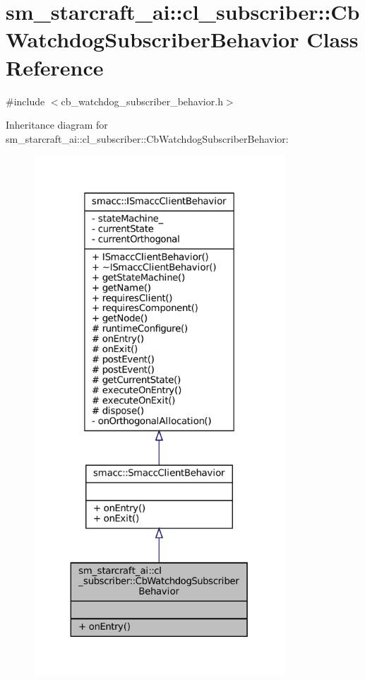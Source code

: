 \hypertarget{classsm__starcraft__ai_1_1cl__subscriber_1_1CbWatchdogSubscriberBehavior}{}\section{sm\+\_\+starcraft\+\_\+ai\+:\+:cl\+\_\+subscriber\+:\+:Cb\+Watchdog\+Subscriber\+Behavior Class Reference}
\label{classsm__starcraft__ai_1_1cl__subscriber_1_1CbWatchdogSubscriberBehavior}


{\ttfamily \#include $<$cb\+\_\+watchdog\+\_\+subscriber\+\_\+behavior.\+h$>$}



Inheritance diagram for sm\+\_\+starcraft\+\_\+ai\+:\+:cl\+\_\+subscriber\+:\+:Cb\+Watchdog\+Subscriber\+Behavior\+:
\nopagebreak
\begin{figure}[H]
\begin{center}
\leavevmode
\includegraphics[height=550pt]{classsm__starcraft__ai_1_1cl__subscriber_1_1CbWatchdogSubscriberBehavior__inherit__graph}
\end{center}
\end{figure}


